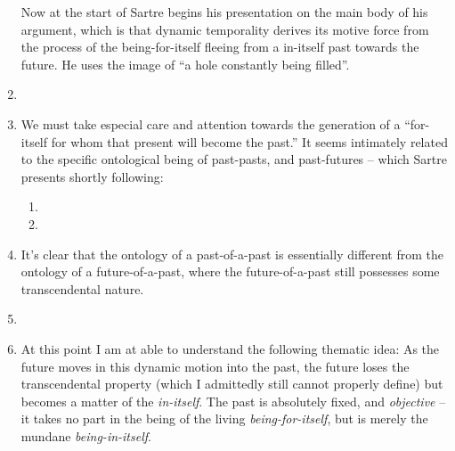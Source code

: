 \begin{enumerate}
  \noindent
  Now at the start of \autocite[211]{sartre} Sartre begins his presentation on the main body of his argument, which is that dynamic temporality derives its motive force from the process of the being-for-itself fleeing from a in-itself past towards the future. He uses the image of \enquote{a hole constantly being filled}.
  \item {}
  \item We must take especial care and attention towards the generation of a \enquote{for-itself for whom that present will become the past.} It seems intimately related to the specific ontological being of past-pasts, and past-futures -- which Sartre presents shortly following:
  \begin{enumerate}
    \item {}
    \item {}
  \end{enumerate}
  \item It's clear that the ontology of a past-of-a-past is essentially different from the ontology of a future-of-a-past, where the future-of-a-past still possesses some transcendental nature.
  \item  {}
  \item At this point I am at able to understand the following thematic idea: As the future moves in this dynamic motion into the past, the future loses the transcendental property (which I admittedly still cannot properly define) but becomes a matter of the \emph{in-itself}. The past is absolutely fixed, and \emph{objective} -- it takes no part in the being of the living \emph{being-for-itself}, but is merely the mundane \emph{being-in-itself}.

\end{enumerate}
